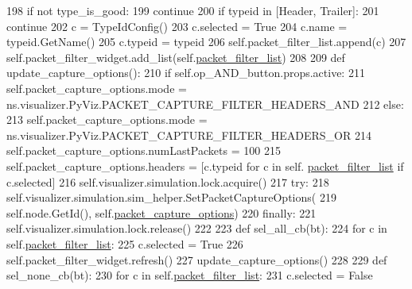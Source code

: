 \begin{DoxyCode}
{198             \textcolor{keywordflow}{if} \textcolor{keywordflow}{not} type\_is\_good:
199                 \textcolor{keywordflow}{continue}
200             \textcolor{keywordflow}{if} typeid \textcolor{keywordflow}{in} [Header, Trailer]:
201                 \textcolor{keywordflow}{continue}
202             c = TypeIdConfig()
203             c.selected = \textcolor{keyword}{True}
204             c.name = typeid.GetName()
205             c.typeid = typeid
206             self.packet\_filter\_list.append(c)
207         self.packet\_filter\_widget.add\_list(self.\hyperlink{classshow__last__packets_1_1ShowLastPackets_afb948244d0751d3a493657bb1b3af47f}{packet\_filter\_list})
208 
209         \textcolor{keyword}{def }update\_capture\_options():
210             \textcolor{keywordflow}{if} self.op\_AND\_button.props.active:
211                 self.packet\_capture\_options.mode = ns.visualizer.PyViz.PACKET\_CAPTURE\_FILTER\_HEADERS\_AND
212             \textcolor{keywordflow}{else}:
213                 self.packet\_capture\_options.mode = ns.visualizer.PyViz.PACKET\_CAPTURE\_FILTER\_HEADERS\_OR
214             self.packet\_capture\_options.numLastPackets = 100
215             self.packet\_capture\_options.headers = [c.typeid \textcolor{keywordflow}{for} c \textcolor{keywordflow}{in} self.
      \hyperlink{classshow__last__packets_1_1ShowLastPackets_afb948244d0751d3a493657bb1b3af47f}{packet\_filter\_list} \textcolor{keywordflow}{if} c.selected]
216             self.visualizer.simulation.lock.acquire()
217             \textcolor{keywordflow}{try}:
218                 self.visualizer.simulation.sim\_helper.SetPacketCaptureOptions(
219                     self.node.GetId(), self.\hyperlink{classshow__last__packets_1_1ShowLastPackets_a66331507375ad09ebb8ffae3450ec38c}{packet\_capture\_options})
220             \textcolor{keywordflow}{finally}:
221                 self.visualizer.simulation.lock.release()
222 
223         \textcolor{keyword}{def }sel\_all\_cb(bt):
224             \textcolor{keywordflow}{for} c \textcolor{keywordflow}{in} self.\hyperlink{classshow__last__packets_1_1ShowLastPackets_afb948244d0751d3a493657bb1b3af47f}{packet\_filter\_list}:
225                 c.selected = \textcolor{keyword}{True}
226             self.packet\_filter\_widget.refresh()
227             update\_capture\_options()
228 
229         \textcolor{keyword}{def }sel\_none\_cb(bt):
230             \textcolor{keywordflow}{for} c \textcolor{keywordflow}{in} self.\hyperlink{classshow__last__packets_1_1ShowLastPackets_afb948244d0751d3a493657bb1b3af47f}{packet\_filter\_list}:
231                 c.selected = \textcolor{keyword}{False}
}
\end{DoxyCode}
